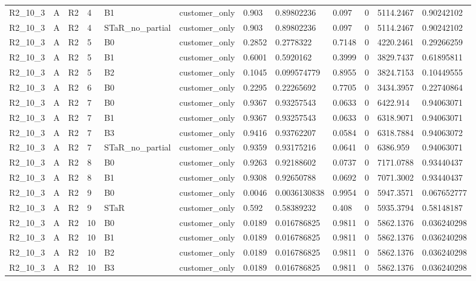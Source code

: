 \begin{longtable}{llllllllllll}
R2\_10\_3 & A & R2 & 4 & B1 & customer\_only & 0.903 & 0.89802236 & 0.097 & 0 & 5114.2467 & 0.90242102 \\
R2\_10\_3 & A & R2 & 4 & STaR\_no\_partial & customer\_only & 0.903 & 0.89802236 & 0.097 & 0 & 5114.2467 & 0.90242102 \\
R2\_10\_3 & A & R2 & 5 & B0 & customer\_only & 0.2852 & 0.2778322 & 0.7148 & 0 & 4220.2461 & 0.29266259 \\
R2\_10\_3 & A & R2 & 5 & B1 & customer\_only & 0.6001 & 0.5920162 & 0.3999 & 0 & 3829.7437 & 0.61895811 \\
R2\_10\_3 & A & R2 & 5 & B2 & customer\_only & 0.1045 & 0.099574779 & 0.8955 & 0 & 3824.7153 & 0.10449555 \\
R2\_10\_3 & A & R2 & 6 & B0 & customer\_only & 0.2295 & 0.22265692 & 0.7705 & 0 & 3434.3957 & 0.22740864 \\
R2\_10\_3 & A & R2 & 7 & B0 & customer\_only & 0.9367 & 0.93257543 & 0.0633 & 0 & 6422.914 & 0.94063071 \\
R2\_10\_3 & A & R2 & 7 & B1 & customer\_only & 0.9367 & 0.93257543 & 0.0633 & 0 & 6318.9071 & 0.94063071 \\
R2\_10\_3 & A & R2 & 7 & B3 & customer\_only & 0.9416 & 0.93762207 & 0.0584 & 0 & 6318.7884 & 0.94063072 \\
R2\_10\_3 & A & R2 & 7 & STaR\_no\_partial & customer\_only & 0.9359 & 0.93175216 & 0.0641 & 0 & 6386.959 & 0.94063071 \\
R2\_10\_3 & A & R2 & 8 & B0 & customer\_only & 0.9263 & 0.92188602 & 0.0737 & 0 & 7171.0788 & 0.93440437 \\
R2\_10\_3 & A & R2 & 8 & B1 & customer\_only & 0.9308 & 0.92650788 & 0.0692 & 0 & 7071.3002 & 0.93440437 \\
R2\_10\_3 & A & R2 & 9 & B0 & customer\_only & 0.0046 & 0.0036130838 & 0.9954 & 0 & 5947.3571 & 0.067652777 \\
R2\_10\_3 & A & R2 & 9 & STaR & customer\_only & 0.592 & 0.58389232 & 0.408 & 0 & 5935.3794 & 0.58148187 \\
R2\_10\_3 & A & R2 & 10 & B0 & customer\_only & 0.0189 & 0.016786825 & 0.9811 & 0 & 5862.1376 & 0.036240298 \\
R2\_10\_3 & A & R2 & 10 & B1 & customer\_only & 0.0189 & 0.016786825 & 0.9811 & 0 & 5862.1376 & 0.036240298 \\
R2\_10\_3 & A & R2 & 10 & B2 & customer\_only & 0.0189 & 0.016786825 & 0.9811 & 0 & 5862.1376 & 0.036240298 \\
R2\_10\_3 & A & R2 & 10 & B3 & customer\_only & 0.0189 & 0.016786825 & 0.9811 & 0 & 5862.1376 & 0.036240298 \\

\end{longtable}
